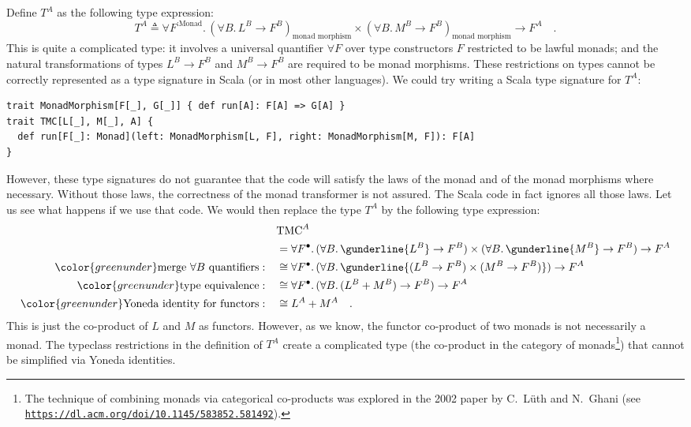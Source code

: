 Define $T^{A}$ as the following type expression:
\[
T^{A}\triangleq\forall F^{:\text{Monad}}.\,(\forall B.\,L^{B}\rightarrow F^{B})_{\text{monad morphism}}\times(\forall B.\,M^{B}\rightarrow F^{B})_{\text{monad morphism}}\rightarrow F^{A}\quad.
\]
This is quite a complicated type: it involves a universal quantifier
$\forall F$ over type constructors $F$ restricted to be lawful monads;
and the natural transformations of types $L^{B}\rightarrow F^{B}$
and $M^{B}\rightarrow F^{B}$ are required to be monad morphisms.
These restrictions on types cannot be correctly represented as a type
signature in Scala (or in most other languages). We could try writing
a Scala type signature for $T^{A}$:
\begin{lstlisting}
trait MonadMorphism[F[_], G[_]] { def run[A]: F[A] => G[A] }
trait TMC[L[_], M[_], A] {
  def run[F[_]: Monad](left: MonadMorphism[L, F], right: MonadMorphism[M, F]): F[A]
}
\end{lstlisting}
However, these type signatures do not guarantee that the code will
satisfy the laws of the monad and of the monad morphisms where necessary.
Without those laws, the correctness of the monad transformer is not
assured. The Scala code in fact ignores all those laws. Let us see
what happens if we use that code. We would then replace the type $T^{A}$
by the following type expression:
\begin{align*}
 & \text{TMC}^{A}\\
 & =\forall F^{\bullet}.\,(\forall B.\,\gunderline{L^{B}}\rightarrow F^{B})\times(\forall B.\,\gunderline{M^{B}}\rightarrow F^{B})\rightarrow F^{A}\\
{\color{greenunder}\text{merge }\forall B\text{ quantifiers}:}\quad & \cong\forall F^{\bullet}.\,(\forall B.\,\gunderline{(L^{B}\rightarrow F^{B})\times(M^{B}\rightarrow F^{B})})\rightarrow F^{A}\\
{\color{greenunder}\text{type equivalence}:}\quad & \cong\forall F^{\bullet}.\,(\forall B.\,(L^{B}+M^{B})\rightarrow F^{B})\rightarrow F^{A}\\
{\color{greenunder}\text{Yoneda identity for functors}:}\quad & \cong L^{A}+M^{A}\quad.
\end{align*}
This is just the co-product of $L$ and $M$ as functors. However,
as we know, the functor co-product of two monads is not necessarily
a monad. The typeclass restrictions in the definition of $T^{A}$
create a complicated type (the co-product in the category of monads\footnote{The technique of combining monads via categorical co-products was
explored in the 2002 paper by C.~L\"uth and N.~Ghani (see \texttt{\href{https://dl.acm.org/doi/10.1145/583852.581492}{https://dl.acm.org/doi/10.1145/583852.581492}}).}) that cannot be simplified via Yoneda identities.

